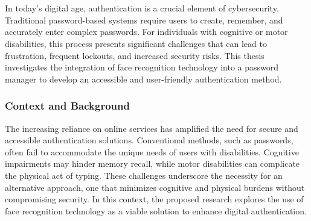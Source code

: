 
\chapter{}%
\label{ch:inleiding}

In today's digital age, authentication is a crucial element of cybersecurity. Traditional password-based systems require users to create, remember, and accurately enter complex passwords. For individuals with cognitive or motor disabilities, this process presents significant challenges that can lead to frustration, frequent lockouts, and increased security risks. This thesis investigates the integration of face recognition technology into a password manager to develop an accessible and user-friendly authentication method.

\subsection{Context and Background}
The increasing reliance on online services has amplified the need for secure and accessible authentication solutions. Conventional methods, such as passwords, often fail to accommodate the unique needs of users with disabilities. Cognitive impairments may hinder memory recall, while motor disabilities can complicate the physical act of typing. These challenges underscore the necessity for an alternative approach, one that minimizes cognitive and physical burdens without compromising security. In this context, the proposed research explores the use of face recognition technology as a viable solution to enhance digital authentication.

\clearpage
